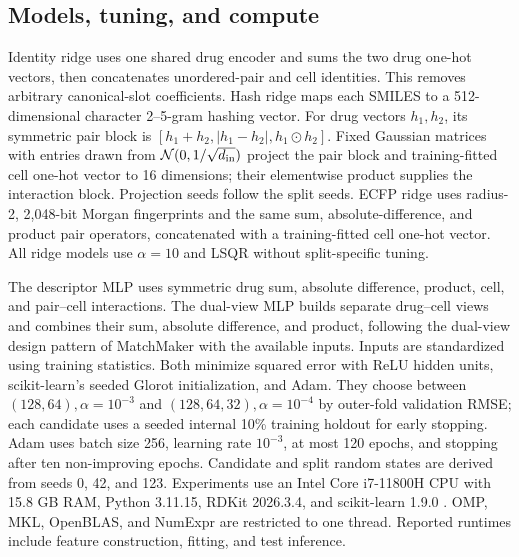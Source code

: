 \documentclass[conference]{IEEEtran}
\begin{document}
\subsection{Models, tuning, and compute}

Identity ridge uses one shared drug encoder and sums the two drug one-hot vectors, then concatenates unordered-pair and cell identities. This removes arbitrary canonical-slot coefficients. Hash ridge maps each SMILES to a 512-dimensional character 2--5-gram hashing vector. For drug vectors $h_1,h_2$, its symmetric pair block is $[h_1+h_2,|h_1-h_2|,h_1\odot h_2]$. Fixed Gaussian matrices with entries drawn from $\mathcal N(0,1/\sqrt{d_{\rm in}})$ project the pair block and training-fitted cell one-hot vector to 16 dimensions; their elementwise product supplies the interaction block. Projection seeds follow the split seeds. ECFP ridge uses radius-2, 2,048-bit Morgan fingerprints \cite{rogers2010ecfp} and the same sum, absolute-difference, and product pair operators, concatenated with a training-fitted cell one-hot vector. All ridge models use $\alpha=10$ and LSQR without split-specific tuning.

The descriptor MLP uses symmetric drug sum, absolute difference, product, cell, and pair--cell interactions. The dual-view MLP builds separate drug--cell views and combines their sum, absolute difference, and product, following the dual-view design pattern of MatchMaker with the available inputs. Inputs are standardized using training statistics. Both minimize squared error with ReLU hidden units, scikit-learn's seeded Glorot initialization, and Adam. They choose between $(128,64),\alpha=10^{-3}$ and $(128,64,32),\alpha=10^{-4}$ by outer-fold validation RMSE; each candidate uses a seeded internal 10\% training holdout for early stopping. Adam uses batch size 256, learning rate $10^{-3}$, at most 120 epochs, and stopping after ten non-improving epochs. Candidate and split random states are derived from seeds 0, 42, and 123. Experiments use an Intel Core i7-11800H CPU with 15.8 GB RAM, Python 3.11.15, RDKit 2026.3.4, and scikit-learn 1.9.0 \cite{sklearn2011}. OMP, MKL, OpenBLAS, and NumExpr are restricted to one thread. Reported runtimes include feature construction, fitting, and test inference.
\end{document}
